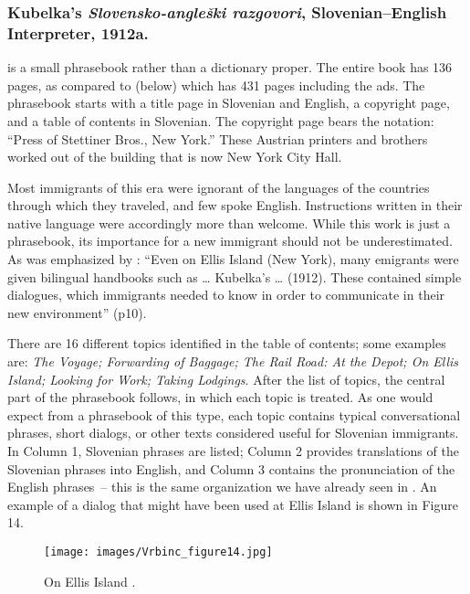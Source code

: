 \documentclass[output=paper,colorlinks,citecolor=brown,arabicfont,chinesefont]{langscibook}
\begin{document}
\subsubsection{Kubelka’s \emph{Slovensko-angleški razgovori}, Slovenian–English Interpreter, 1912a.}

\citet{Kubelka1912a} is a small phrasebook rather than a dictionary proper. The entire book has 136 pages, as compared to \citet{Kubelka1912b} (below) which has 431 pages including the ads. The phrasebook starts with a title page in Slovenian and English, a copyright page, and a table of contents in Slovenian. The copyright page bears the notation: “Press of Stettiner Bros., New York.” These Austrian printers and brothers worked out of the building that is now New York City Hall.

Most immigrants of this era were ignorant of the languages of the countries through which they traveled, and few spoke English. Instructions written in their native language were accordingly more than welcome. While this work is just a phrasebook, its importance for a new immigrant should not be underestimated. As was emphasized by \citet{Drnovsek2006}: “Even on Ellis Island (New York), many emigrants were given bilingual handbooks such as … Kubelka’s … (1912). These contained simple dialogues, which immigrants needed to know in order to communicate in their new environment” (p10).

There are 16 different topics identified in the table of contents; some examples are: \emph{The Voyage; Forwarding of Baggage; The Rail Road: At the Depot; On Ellis Island; Looking for Work; Taking Lodgings}. After the list of topics, the central part of the phrasebook follows, in which each topic is treated. As one would expect from a phrasebook of this type, each topic contains typical conversational phrases, short dialogs, or other texts considered useful for Slovenian immigrants. In Column 1, Slovenian phrases are listed; Column 2 provides translations of the Slovenian phrases into English, and Column 3 contains the pronunciation of the English phrases~-- this is the same organization we have already seen in \citet{Kubelka1904}. An example of a dialog that might have been used at Ellis Island is shown in Figure 14.

\begin{figure}
\texttt{[image: images/Vrbinc\_figure14.jpg]}
\caption{On Ellis Island \citep[9]{Kubelka1912a}.}
\label{Figure 14}
\end{figure}
\end{document}
